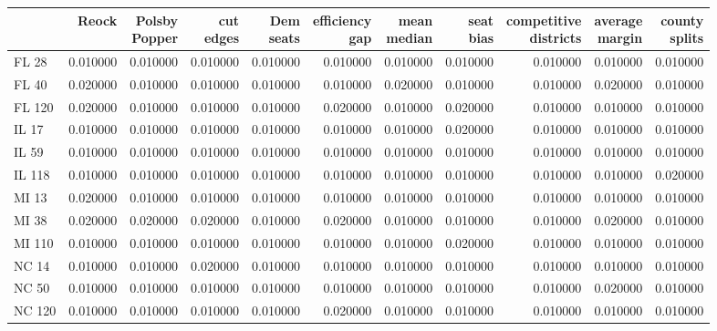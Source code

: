 \begin{tabular}{lrrrrrrrrrr}
\toprule
 & Reock & \makecell{Polsby \\ Popper} & \makecell{cut \\ edges} & \makecell{Dem \\ seats} & \makecell{efficiency \\ gap} & \makecell{mean \\ median} & \makecell{seat \\ bias} & \makecell{competitive \\ districts} & \makecell{average \\ margin} & \makecell{county \\ splits} \\
\midrule
FL 28 & 0.010000 & 0.010000 & 0.010000 & 0.010000 & 0.010000 & 0.010000 & 0.010000 & 0.010000 & 0.010000 & 0.010000 \\
FL 40 & 0.020000 & 0.010000 & 0.010000 & 0.010000 & 0.010000 & 0.020000 & 0.010000 & 0.010000 & 0.020000 & 0.010000 \\
FL 120 & 0.020000 & 0.010000 & 0.010000 & 0.010000 & 0.020000 & 0.010000 & 0.020000 & 0.010000 & 0.010000 & 0.010000 \\
IL 17 & 0.010000 & 0.010000 & 0.010000 & 0.010000 & 0.010000 & 0.010000 & 0.020000 & 0.010000 & 0.010000 & 0.010000 \\
IL 59 & 0.010000 & 0.010000 & 0.010000 & 0.010000 & 0.010000 & 0.010000 & 0.010000 & 0.010000 & 0.010000 & 0.010000 \\
IL 118 & 0.010000 & 0.010000 & 0.010000 & 0.010000 & 0.010000 & 0.010000 & 0.010000 & 0.010000 & 0.010000 & 0.020000 \\
MI 13 & 0.020000 & 0.010000 & 0.010000 & 0.010000 & 0.010000 & 0.010000 & 0.010000 & 0.010000 & 0.010000 & 0.010000 \\
MI 38 & 0.020000 & 0.020000 & 0.020000 & 0.010000 & 0.020000 & 0.010000 & 0.010000 & 0.010000 & 0.020000 & 0.010000 \\
MI 110 & 0.010000 & 0.010000 & 0.010000 & 0.010000 & 0.010000 & 0.010000 & 0.020000 & 0.010000 & 0.010000 & 0.010000 \\
NC 14 & 0.010000 & 0.010000 & 0.020000 & 0.010000 & 0.010000 & 0.010000 & 0.010000 & 0.010000 & 0.010000 & 0.010000 \\
NC 50 & 0.010000 & 0.010000 & 0.010000 & 0.010000 & 0.010000 & 0.010000 & 0.010000 & 0.010000 & 0.020000 & 0.010000 \\
NC 120 & 0.010000 & 0.010000 & 0.010000 & 0.010000 & 0.020000 & 0.010000 & 0.010000 & 0.010000 & 0.010000 & 0.010000 \\

\end{tabular}
